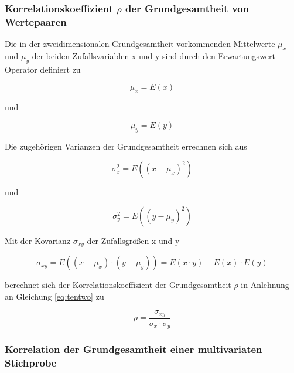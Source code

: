 \subsubsection{Korrelationskoeffizient \texorpdfstring{$\rho$}{Lg} der Grundgesamtheit von Wertepaaren}

\noindent Die in der zweidimensionalen Grundgesamtheit vorkommenden Mittelwerte $\mu_{x}$ und $\mu_{y}$ der beiden Zufallsvariablen x und y sind durch den Erwartungswert-Operator definiert zu

\begin{equation}\label{eq:tennine}
\mu _{x} =E(x)
\end{equation}

\noindent und

\begin{equation}\label{eq:tenten}
\mu _{y} =E(y)
\end{equation}

\noindent Die zugeh\"{o}rigen Varianzen der Grundgesamtheit errechnen sich aus

\begin{equation}\label{eq:teneleven}
\sigma _{x}^{2} =E\left((x-\mu _{x})^{2} \right)
\end{equation}

\noindent und

\begin{equation}\label{eq:tentwelve}
\sigma _{y}^{2} =E\left((y-\mu _{y})^{2} \right)
\end{equation}

\noindent Mit der Kovarianz $\sigma_{xy}$ der Zufallsgr\"{o}{\ss}en x und y

\begin{equation}\label{eq:tenthirteen}
\sigma _{xy} =E\left((x-\mu _{x})\cdot (y-\mu _{y})\right)=E(x\cdot y)-E(x)\cdot E(y)
\end{equation}

\noindent berechnet sich der Korrelationskoeffizient der Grundgesamtheit $\rho$ in Anlehnung an Gleichung \eqref{eq:tentwo} zu 

\begin{equation}\label{eq:tenfourteen}
\rho =\dfrac{\sigma _{xy}}{\sigma _{x} \cdot \sigma _{y}}
\end{equation}

\clearpage

\subsubsection{Korrelation der Grundgesamtheit einer multivariaten Stichprobe}

